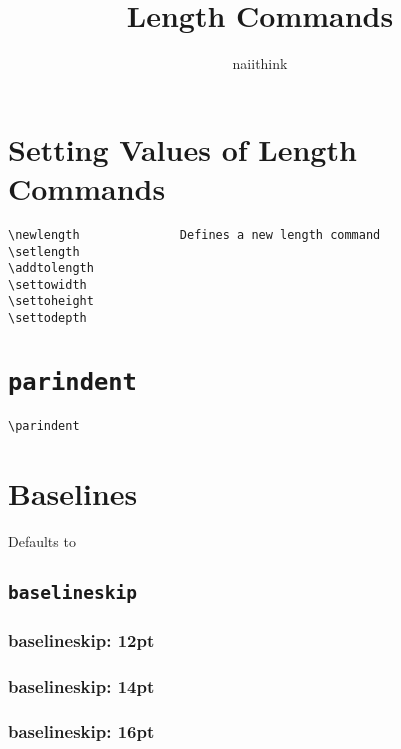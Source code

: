 \documentclass{article}
\title{Length Commands}
\author{naiithink}
\date{}
\begin{document}
\maketitle
\tableofcontents
\newpage

\section{Setting Values of Length Commands}

\begin{verbatim}
\newlength              Defines a new length command
\setlength
\addtolength
\settowidth
\settoheight
\settodepth
\end{verbatim}

\section{\texttt{parindent}}

\verb|\parindent|
\newpage


\section{Baselines}

\let\defaultbaselineskip\baselineskip
Defaults to \the\defaultbaselineskip

\subsection{\texttt{baselineskip}}

\subsubsection{baselineskip: 12pt}

\setlength{\baselineskip}{12pt}
\blindtext[1]

\subsubsection{baselineskip: 14pt}

\setlength{\baselineskip}{14pt}
\blindtext[1]

\subsubsection{baselineskip: 16pt}

\setlength{\baselineskip}{16pt}
\blindtext[1]
\end{document}
